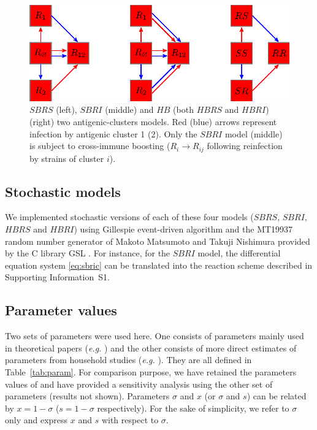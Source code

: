 \begin{figure}[!htbp]
\begin{center}
  \includegraphics[width=0.8\linewidth]{graphs/article1/figure_1.eps}
\end{center}
  \caption{ $SBRS$ (left), $SBRI$ (middle) and $HB$ (both $HBRS$ and
  $HBRI$) (right) two antigenic-clusters models. Red (blue) arrows
  represent infection by antigenic cluster 1 (2). Only the $SBRI$ model
  (middle) is subject to cross-immune boosting ($R_i \to R_{ij}$
  following reinfection by strains of cluster $i$).}
\label{fig:models}
\end{figure}

\clearpage

\subsection{Stochastic models}

We implemented stochastic versions of each of these four models
($SBRS$, $SBRI$, $HBRS$ and $HBRI$) using Gillespie event-driven
algorithm \citep{Gillespie1977} and the MT19937 random number generator
of Makoto Matsumoto and Takuji Nishimura provided by the C library GSL
\citep{Galassi2003}. For instance, for the $SBRI$ model, the
differential equation system \eqref{eq:sbric} can be translated into
the reaction scheme described in Supporting Information~S1.

\subsection{Parameter values}

Two sets of parameters were used here. One consists of parameters
mainly used in theoretical papers (\textit{e.g.} \citet{Koelle2006,
  Ferguson2003, Goekaydin2007}) and the other consists of more direct
estimates of parameters from household studies (\textit{e.g.}
\citet{Cauchemez2004, Lavenu2004, Ferguson2005}). They are all defined
in Table~\ref{tab:param}. For comparison purpose, we have retained the
parameters values of \citet{Koelle2006} and have provided a
sensitivity analysis using the other set of parameters (results not
shown). Parameters $\sigma$ and $x$ (or $\sigma$ and $s$) can be
related by $x=1-\sigma$ ($s=1-\sigma$ respectively). For the sake of
simplicity, we refer to $\sigma$ only and express $x$ and $s$ with
respect to $\sigma$.


